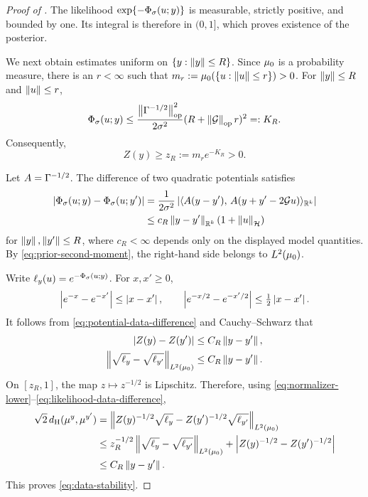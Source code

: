 \begin{proof}[Proof of ]
The likelihood $\exp\{-\Phi_{\sigma}(u;y)\}$ is measurable, strictly
positive, and bounded by one.  Its integral is therefore in $(0,1]$,
which proves existence of the posterior.

We next obtain estimates uniform on $\{y:\left\lVert y\right\rVert\leq R\}$.  Since
${\mu_{0}}$ is a probability measure, there is an $r<\infty$ such that
$m_r:={\mu_{0}}(\{u:\left\lVert u\right\rVert\leq r\})>0$.  For $\left\lVert y\right\rVert\leq R$ and
$\left\lVert u\right\rVert\leq r$,
\[
  \Phi_{\sigma}(u;y)
  \leq
  \frac{\left\lVert\Gamma^{-1/2}\right\rVert_{\mathrm{op}}^2}
       {2\sigma^2}
  (R+\left\lVert\mathcal{G}\right\rVert_{\mathrm{op}}r)^2
  =:K_R .
\]
Consequently,
\begin{equation}
  Z(y)\geq z_R:=m_r e^{-K_R}>0 .
  \label{eq:normalizer-lower}
\end{equation}

Let $A=\Gamma^{-1/2}$.  The difference of two quadratic potentials
satisfies
\begin{align}
  \left\lvert\Phi_{\sigma}(u;y)-\Phi_{\sigma}(u;y')\right\rvert
  &=
  \frac{1}{2\sigma^2}
  \left\lvert
    \langle A(y-y'),\,A(y+y'-2\mathcal{G} u)\rangle_{\mathbb{R}^k}
  \right\rvert\notag\\
  &\leq
  c_R\left\lVert y-y'\right\rVert_{\mathbb{R}^k}(1+\left\lVert u\right\rVert_{\mathcal{H}})
  \label{eq:potential-data-difference}
\end{align}
for $\left\lVert y\right\rVert,\left\lVert y'\right\rVert\leq R$, where $c_R<\infty$ depends only on
the displayed model quantities.  By
\eqref{eq:prior-second-moment}, the right-hand side belongs to
$L^2({\mu_{0}})$.

Write $\ell_y(u)=e^{-\Phi_{\sigma}(u;y)}$.  For $x,x'\geq0$,
\[
  \left\lvert e^{-x}-e^{-x'}\right\rvert\leq\left\lvert x-x'\right\rvert,\qquad
  \left\lvert e^{-x/2}-e^{-x'/2}\right\rvert\leq\tfrac12\left\lvert x-x'\right\rvert.
\]
It follows from \eqref{eq:potential-data-difference} and
Cauchy--Schwarz that
\begin{align}
  \left\lvert Z(y)-Z(y')\right\rvert
    &\leq C_R\left\lVert y-y'\right\rVert, \label{eq:normalizer-data-difference}\\
  \left\lVert\sqrt{\ell_y}-\sqrt{\ell_{y'}}\right\rVert_{L^2({\mu_{0}})}
    &\leq C_R\left\lVert y-y'\right\rVert. \label{eq:likelihood-data-difference}
\end{align}
On $[z_R,1]$, the map $z\mapsto z^{-1/2}$ is Lipschitz.  Therefore,
using \eqref{eq:normalizer-lower}--\eqref{eq:likelihood-data-difference},
\begin{align*}
  \sqrt{2}\,{d_{\mathrm{H}}}(\mu^y,\mu^{y'})
  &=
  \left\lVert
    Z(y)^{-1/2}\sqrt{\ell_y}
    -Z(y')^{-1/2}\sqrt{\ell_{y'}}
  \right\rVert_{L^2({\mu_{0}})}\\
  &\leq
  z_R^{-1/2}
  \left\lVert\sqrt{\ell_y}-\sqrt{\ell_{y'}}\right\rVert_{L^2({\mu_{0}})}
  +\left\lvert Z(y)^{-1/2}-Z(y')^{-1/2}\right\rvert\\
  &\leq C_R\left\lVert y-y'\right\rVert.
\end{align*}
This proves \eqref{eq:data-stability}.
\end{proof}
